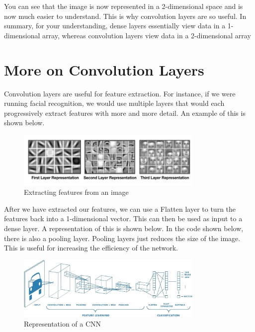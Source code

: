 \documentclass[11pt]{report}
\begin{document}
\pagebreak

You can see that the image is now represented in a 2-dimensional space and is now much easier to understand. This is why convolution layers are so useful.
In summary, for your understanding, dense layers essentially view data in a 1-dimensional array, whereas convolution layers view data in a 2-dimensional array

\section{More on Convolution Layers}
Convolution layers are useful for feature extraction. For instance, if we were running facial recognition, we would use multiple layers that would each progressively extract features with more and more detail. An example of this is shown below.

\begin{figure}[h]
\centering
\includegraphics[width=0.8\textwidth]{./images/featureextraction.jpg}
\caption{Extracting features from an image}
\label{fig:conv1}
\end{figure}

After we have extracted our features, we can use a Flatten layer to turn the features back into a 1-dimensional vector. This can then be used as input to a dense layer. A representation of this is shown below. In the code shown below, there is also a pooling layer. Pooling layers just reduces the size of the image. This is useful for increasing the efficiency of the network.

\begin{figure}[h]
\centering
\includegraphics[width=0.8\textwidth]{./images/convexamp.jpeg}
\caption{Representation of a CNN}
\label{fig:cnn}
\end{figure}
\end{document}
